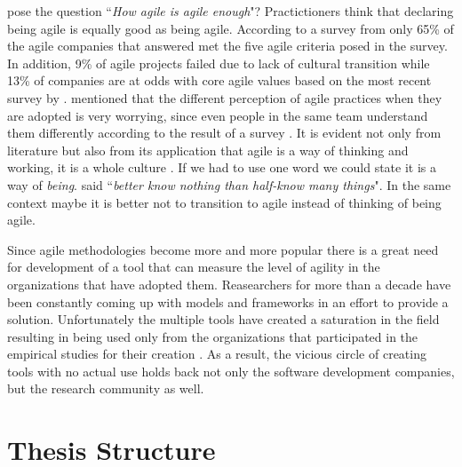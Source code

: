 \citet{comparative_agility} pose the question ``\textit{How agile is agile enough}"? Practictioners think that declaring being agile is equally good as being agile. According to a survey from \citet{ambysoft} only 65\% of the agile companies that answered met the five agile criteria posed in the survey. In addition, 9\% of agile projects failed due to lack of cultural transition while 13\% of companies are at odds with core agile values based on the most recent survey by \citet{versionOne}. \citet{poonacha} mentioned that the different perception of agile practices when they are adopted is very worrying, since even people in the same team understand them differently according to the result of a survey \cite{ambler}. It is evident not only from literature but also from its application that agile is a way of thinking and working, it is a whole culture \cite{poonacha}. If we had to use one word we could state it is a way of \textit{being}. \citet{Nietzsche} said ``\textit{better know nothing than half-know many things}". In the same context maybe it is better not to transition to agile instead of thinking of being agile. 

Since agile methodologies become more and more popular there is a great need for development of a tool that can measure the level of agility in the organizations that have adopted them. Reasearchers for more than a decade have been constantly coming up with models and frameworks in an effort to provide a solution. Unfortunately the multiple tools have created a saturation in the field resulting in being used only from the organizations that participated in the empirical studies for their creation \cite{samireh_jalali_dissertation}\cite{Jalali2014}. As a result, the vicious circle of creating tools with no actual use holds back not only the software development companies, but the research community as well.


\section{Thesis Structure}







